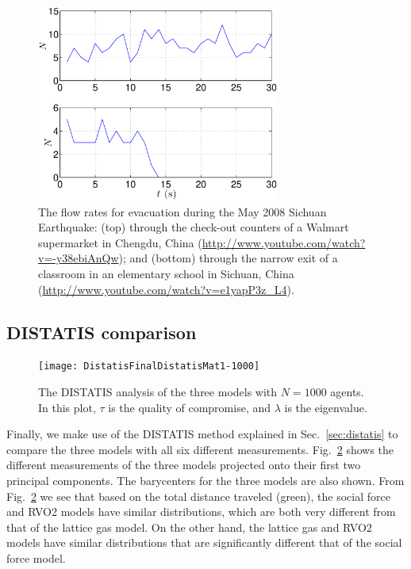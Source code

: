 \begin{figure}[htbp]
\includegraphics[width=8cm]{figures/Flowrate}
\caption{The flow rates for evacuation during the May 2008 Sichuan Earthquake: (top) through the check-out counters of a Walmart supermarket in Chengdu, China (\url{http://www.youtube.com/watch?v=-y38ebiAnQw}); and (bottom) through the narrow exit of a classroom in an elementary school in Sichuan, China (\url{http://www.youtube.com/watch?v=e1yapP3z_L4}).}
\centering
\label{fig:RealData}
\end{figure}


\subsection{DISTATIS comparison}

\begin{figure}[htbp]
\centering
\texttt{[image: DistatisFinalDistatisMat1-1000]}
\caption{The DISTATIS analysis of the three models with $N = 1000$ agents. In this plot, $\tau$ is the quality of compromise, and $\lambda$ is the eigenvalue.}
\label{fig:Distatis1000}
\end{figure}

Finally, we make use of the DISTATIS method explained in Sec.~\ref{sec:distatis} to compare the three models with all six different measurements. Fig.~\ref{fig:Distatis1000} shows the different measurements of the three models projected onto their first two principal components. The barycenters for the three models are also shown. From Fig.~\ref{fig:Distatis1000} we see that based on the total distance traveled (green), the social force and RVO2 models have similar distributions, which are both very different from that of the lattice gas model. On the other hand, the lattice gas and RVO2 models have similar distributions that are significantly different that of the social force model.

